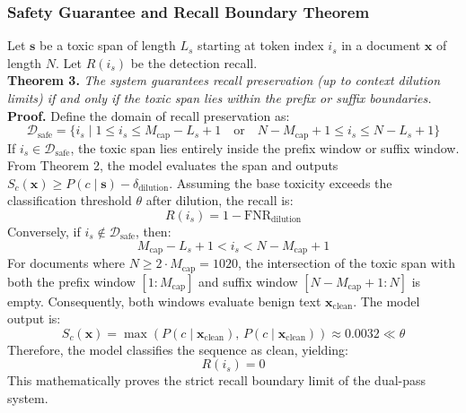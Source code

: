 \documentclass[10pt]{article}
\begin{document}
\subsubsection{Safety Guarantee and Recall Boundary Theorem}
Let $\mathbf{s}$ be a toxic span of length $L_s$ starting at token index $i_s$ in a document $\mathbf{x}$ of length $N$. Let $R(i_s)$ be the detection recall.
\\
\textbf{Theorem 3.} \textit{The system guarantees recall preservation (up to context dilution limits) if and only if the toxic span lies within the prefix or suffix boundaries.}
\\
\textbf{Proof.}
Define the domain of recall preservation as:
\begin{equation}
\mathcal{D}_{\text{safe}} = \{ i_s \mid 1 \le i_s \le M_{\text{cap}} - L_s + 1 \quad \text{or} \quad N - M_{\text{cap}} + 1 \le i_s \le N - L_s + 1 \}
\end{equation}
If $i_s \in \mathcal{D}_{\text{safe}}$, the toxic span lies entirely inside the prefix window or suffix window. From Theorem 2, the model evaluates the span and outputs $S_c(\mathbf{x}) \ge P(c \mid \mathbf{s}) - \delta_{\text{dilution}}$. Assuming the base toxicity exceeds the classification threshold $\theta$ after dilution, the recall is:
\begin{equation}
R(i_s) = 1 - \text{FNR}_{\text{dilution}}
\end{equation}
Conversely, if $i_s \notin \mathcal{D}_{\text{safe}}$, then:
\begin{equation}
M_{\text{cap}} - L_s + 1 < i_s < N - M_{\text{cap}} + 1
\end{equation}
For documents where $N \ge 2 \cdot M_{\text{cap}} = 1020$, the intersection of the toxic span with both the prefix window $[1:M_{\text{cap}}]$ and suffix window $[N - M_{\text{cap}} + 1:N]$ is empty. Consequently, both windows evaluate benign text $\mathbf{x}_{\text{clean}}$. The model output is:
\begin{equation}
S_c(\mathbf{x}) = \max\left( P(c \mid \mathbf{x}_{\text{clean}}), \, P(c \mid \mathbf{x}_{\text{clean}}) \right) \approx 0.0032 \ll \theta
\end{equation}
Therefore, the model classifies the sequence as clean, yielding:
\begin{equation}
R(i_s) = 0
\end{equation}
This mathematically proves the strict recall boundary limit of the dual-pass system.
\end{document}
